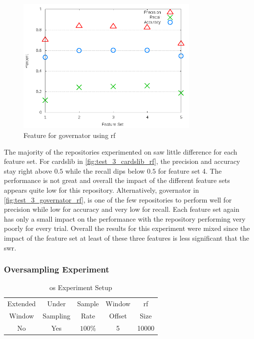 \begin{figure}[!ht]
    \centering
        \includegraphics[width=0.8\textwidth]{images/rf/test_3/governator_sample_range}
    \caption{Feature for governator using \gls{rf}}
    \label{fig:test_3_governator_rf}
\end{figure}

The majority of the repositories experimented on saw little difference for each feature set. For cardslib in \autoref{fig:test_3_cardslib_rf}, the precision and accuracy stay right above $0.5$ while the recall dips below $0.5$ for feature set 4. The performance is not great and overall the impact of the different feature sets appears quite low for this repository. Alternatively, governator in \autoref{fig:test_3_governator_rf}, is one of the few repositories to perform well for precision while low for accuracy and very low for recall. Each feature set again has only a small impact on the performance with the repository performing very poorly for every trial. Overall the results for this experiment were mixed since the impact of the feature set at least of these three features is less significant that the \gls{swr}.

\subsubsection{Oversampling Experiment}
\label{sec:oversampling_experiment_rf}

\begin{table}[h]
\begin{center}

    \begin{tabular}{|c|c|c|c|c|}
        \hline
        Extended & Under & Sample & Window & \gls{rf} \\
        Window & Sampling & Rate & Offset & Size \\ \hline
        No & Yes & $100\%$ & 5 & 10000 \\ \hline
    \end{tabular}
    \caption{\gls{os} Experiment Setup}
    \label{tab:rf_os_experiment_setup}
\end{center}

\end{table}


